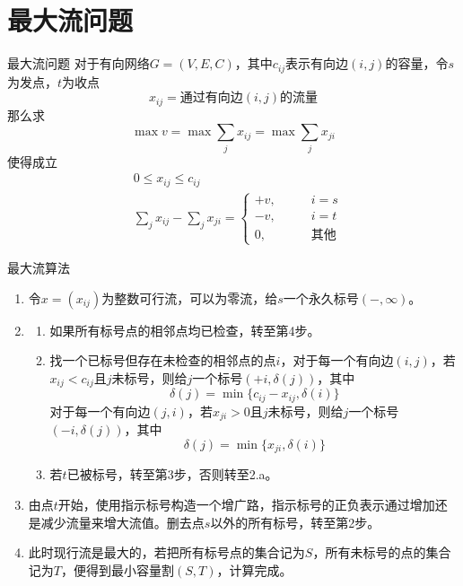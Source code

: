 \documentclass[lang = cn, scheme = chinese, thmcnt = section]{elegantbook}
\begin{document}
\section{最大流问题}

\begin{definition}{最大流问题}
	对于有向网络$G=(V,E,C)$，其中$c_{ij}$表示有向边$(i,j)$的容量，令$s$为发点，$t$为收点%
	$$
	x_{ij}=\text{通过有向边}(i,j)\text{的流量}
	$$
	那么求%
	$$
	\max v=
	\max \sum_{j}x_{ij}=
	\max \sum_{j}x_{ji}
	$$
	使得成立
	\begin{align*}
		& 0\le x_{ij}\le c_{ij}\\
		& \sum_{j}x_{ij}-\sum_{j}x_{ji}=\begin{cases}
			+v,\qquad & i=s\\
			-v,\qquad & i=t\\
			0,\qquad & \text{其他}
		\end{cases}
	\end{align*}
\end{definition}

\begin{theorem}{最大流算法}
	\begin{enumerate}
		\item 令$x=(x_{ij})$为整数可行流，可以为零流，给$s$一个永久标号$(-,\infty)$。
		\item \begin{enumerate}
			\item 如果所有标号点的相邻点均已检查，转至第4步。
			\item 找一个已标号但存在未检查的相邻点的点$i$，对于每一个有向边$(i,j)$，若$x_{ij}<c_{ij}$且$j$未标号，则给$j$一个标号$(+i,\delta(j))$，其中%
			$$
			\delta(j)=\min\{ c_{ij}-x_{ij},\delta(i) \}
			$$
			对于每一个有向边$(j,i)$，若$x_{ji}>0$且$j$未标号，则给$j$一个标号$(-i,\delta(j))$，其中%
			$$
			\delta(j)=\min\{ x_{ji},\delta(i) \}
			$$
			\item 若$t$已被标号，转至第3步，否则转至2.a。
		\end{enumerate}
		\item 由点$t$开始，使用指示标号构造一个增广路，指示标号的正负表示通过增加还是减少流量来增大流值。删去点$s$以外的所有标号，转至第2步。
		\item 此时现行流是最大的，若把所有标号点的集合记为$S$，所有未标号的点的集合记为$T$，便得到最小容量割$(S,T)$，计算完成。
	\end{enumerate}
\end{theorem}
\end{document}
